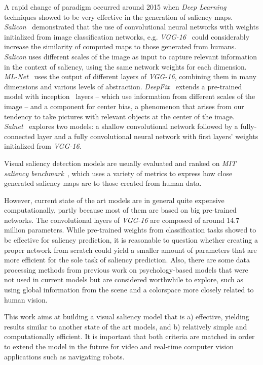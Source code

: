 \documentclass[10pt,twocolumn,letterpaper]{article}
\begin{document}
A rapid change of paradigm occurred around 2015 when \emph{Deep Learning}
techniques showed to be very effective in the generation of saliency
maps.
\emph{Salicon}~\cite{jiang_2015} demonstrated that the use of
convolutional neural networks with weights initialized from
image classification networks, e.g. \emph{VGG-16}~\cite{zisserman_2014}
could considerably increase the similarity of computed maps to those
generated from humans.
\emph{Salicon} uses different scales of the image as input to capture relevant
information in the context of saliency, using the same network weights
for each dimension.
\emph{ML-Net}~\cite{cornia_2016} uses the output of different layers
of \emph{VGG-16}, combining them in many dimensions and various levels of
abstraction.
\emph{DeepFix}~\cite{kruthiventi_2015} extends a pre-trained model with
inception~\cite{szegedy_2014} layers -- which use information from different
scales of the image -- and a component for center bias, a phenomenon that arises from our tendency to take pictures with relevant
objects at the center of the image.
\emph{Salnet}~\cite{pan_2016} explores two models: a shallow convolutional network followed by a fully-connected layer and a fully convolutional
neural network with first layers' weights initialized from \emph{VGG-16}.

Visual saliency detection models are usually evaluated and ranked on
\emph{MIT saliency benchmark}~\cite{mit_sal_bm}, which uses a variety of
metrics to express how close generated saliency maps are to those created
from human data.

However, current state of the art models are in general quite expensive computationally,
partly because most of them are based on big pre-trained networks.
The convolutional layers of \emph{VGG-16} are composed of around 14.7
million parameters.
While pre-trained weights from classification tasks showed to be effective
for saliency prediction, it is reasonable to question whether
creating a proper network from scratch could yield a smaller amount of
parameters that are more efficient for the sole task of saliency prediction.
Also, there are some data processing methods from previous work on
psychology-based models that were not used in current models but
are considered worthwhile to explore,
such as using global information from the scene and a colorspace more
closely related to human vision.

This work aims at building a visual saliency model that is a) effective,
yielding results similar to another state of the art models,
and b) relatively simple and computationally efficient.
It is important that both criteria are matched in order to extend the
model in the future for video and real-time computer vision applications
such as navigating robots.
\end{document}
